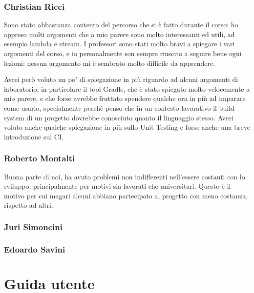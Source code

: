 \subsection{Christian Ricci}

Sono stato abbastanza contento del percorso che si è fatto durante il corso: ho appreso molti argomenti che a mio parere sono molto interessanti ed utili, ad esempio lambda e stream. I professori sono stati molto bravi a spiegare i vari argomenti del corso, e io personalmente son sempre riuscito a seguire bene ogni lezioni: nessun argomento mi è sembrato molto difficile da apprendere.

Avrei però voluto un po' di spiegazione in più riguardo ad alcuni argomenti di laboratorio, in particolare il tool Gradle, che è stato spiegato molto velocemente a mio parere, e che forse avrebbe fruttato spendere qualche ora in più ad imparare come usarlo, specialmente perchè penso che in un contesto lavorativo il build system di un progetto dovrebbe conosciuto quanto il linguaggio stesso. Avrei voluto anche qualche spiegazione in più sullo Unit Testing e forse anche una breve introduzione sul CI.

\subsection{Roberto Montalti}

Buona parte di noi, ha avuto problemi non indifferenti nell'essere costanti con lo sviluppo, principalmente per motivi sia lavorati che universitari.
Questo è il motivo per cui magari alcuni abbiano partecipato al progetto con meno costanza, rispetto ad altri.

\subsection{Juri Simoncini}

\subsection{Edoardo Savini}

\appendix

\chapter{Guida utente}





